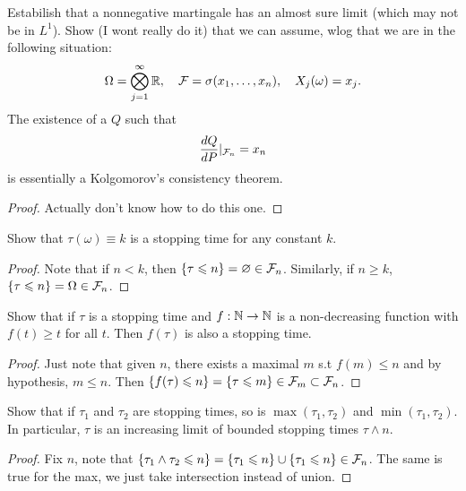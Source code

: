 \begin{exercise}[5.4]
	Estabilish that a nonnegative martingale has an almost sure limit
	(which may not be in $L^1$).
	Show (I wont really do it) that we can assume, wlog that we are in
	the following situation:
	\[
		\Omega = \bigotimes_{j=1}^{\infty} \mathbb{R}, \quad \mathcal{F} = \sigma(x_1,
		\dots, x_n),\quad X_j(\omega) = x_j.
	\]
	The existence of a $Q$ such that
	\[
		\frac{dQ}{dP}|_{\mathcal{F}_n} = x_n
	\]
	is essentially a Kolgomorov's consistency theorem.
\end{exercise}
\begin{proof}
	Actually don't know how to do this one.
\end{proof}

\begin{exercise}[5.5]
	Show that $\tau(\omega) \equiv k$ is a stopping time for any constant $k$.
\end{exercise}
\begin{proof}
	Note that if $n < k$, then $\{\tau \leqslant n\} = \varnothing \in
	\mathcal{F}_n$. Similarly, if $n \geq k$,
	$\{\tau \leqslant n\} = \Omega \in \mathcal{F}_n$.
\end{proof}

\begin{exercise}[5.6]
	Show that if $\tau$ is a stopping time and $f : \mathbb{N} \rightarrow \mathbb{N}$ is a
	non-decreasing function
	with $f(t) \geq t$ for all $t$. Then $f(\tau)$ is also a stopping time.
\end{exercise}
\begin{proof}
	Just note that given $n$, there exists a maximal $m$ s.t $f(m) \leq
	n$ and by hypothesis, $m \leq n$. Then
	$\{f(\tau) \leqslant n\} = \{\tau \leqslant m\} \in \mathcal{F}_m \subset \mathcal{F}_n$.
\end{proof}

\begin{exercise}[5.7]
	Show that if $\tau_1$ and $\tau_2$ are stopping times, so is
	$\max(\tau_1, \tau_2)$ and $\min(\tau_1, \tau_2)$.
	In particular, $\tau$ is an increasing limit of bounded stopping
	times $\tau \land n$.
\end{exercise}
\begin{proof}
	Fix $n$, note that $\{\tau_1 \land \tau_2 \leqslant n\} = \{\tau_1 \leqslant
	n\} \cup \{\tau_1 \leqslant n\} \in \mathcal{F}_n$.
	The same is true for the max, we just take intersection instead of union.
\end{proof}

